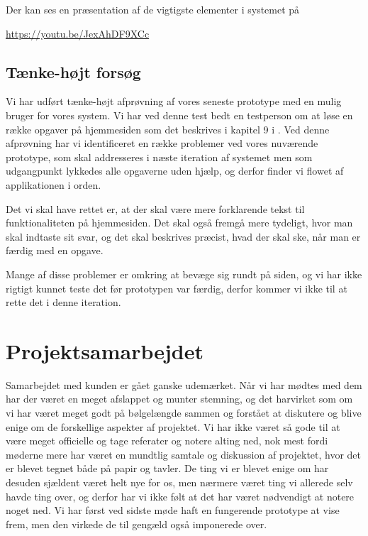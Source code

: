 \documentclass[11pt, a4paper]{article}
\begin{document}
Der kan ses en præsentation af de vigtigste elementer i systemet på
\begin{framed}
    \centering
    \url{https://youtu.be/JexAhDF9XCc}
\end{framed}

\subsection{Tænke-højt forsøg}
\label{sub:taenke_hoejt}
Vi har udført tænke-højt afprøvning af vores seneste prototype med en mulig bruger for vores system. Vi har ved denne test bedt en testperson om at løse en række opgaver på hjemmesiden som det beskrives i kapitel 9 i \cite{molich}. Ved denne afprøvning har vi identificeret en række problemer ved vores nuværende prototype, som skal addresseres i næste iteration af systemet men som udgangpunkt lykkedes alle opgaverne uden hjælp, og derfor finder vi flowet af applikationen i orden.

Det vi skal have rettet er, at der skal være mere forklarende tekst til funktionaliteten på hjemmesiden. Det skal også fremgå mere tydeligt, hvor man skal indtaste sit svar, og det skal beskrives præcist, hvad der skal ske, når man er færdig med en opgave.

Mange af disse problemer er omkring at bevæge sig rundt på siden, og vi har ikke rigtigt kunnet teste det før prototypen var færdig, derfor kommer vi ikke til at rette det i denne iteration.

\section{Projektsamarbejdet}
\label{sec:projektsamarbejdet}
Samarbejdet med kunden er gået ganske udemærket. Når vi har mødtes med dem har der været en meget afslappet og munter stemning, og det harvirket som om vi har været meget godt på bølgelængde sammen og forstået at diskutere og blive enige om de forskellige aspekter af projektet. Vi har ikke været så gode til at være meget officielle og tage referater og notere alting ned, nok mest fordi møderne mere har været en mundtlig samtale og diskussion af projektet, hvor det er blevet tegnet både på papir og tavler. De ting vi er blevet enige om har desuden sjældent været helt nye for os, men nærmere været ting vi allerede selv havde ting over, og derfor har vi ikke følt at det har været nødvendigt at notere noget ned. Vi har først ved sidste møde haft en fungerende prototype at vise frem, men den virkede de til gengæld også imponerede over.
\end{document}
